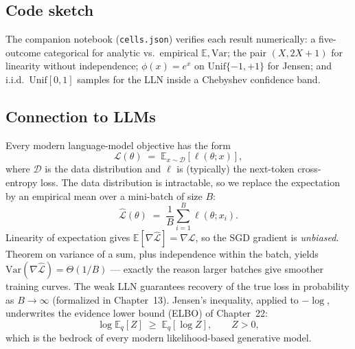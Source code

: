 \subsection*{Code sketch}

The companion notebook (\texttt{cells.json}) verifies each result numerically: a five-outcome categorical for analytic vs.\ empirical $\mathbb{E},\mathrm{Var}$; the pair $(X, 2X+1)$ for linearity without independence; $\phi(x)=e^x$ on $\mathrm{Unif}\{-1,+1\}$ for Jensen; and i.i.d.\ $\mathrm{Unif}[0,1]$ samples for the LLN inside a Chebyshev confidence band.

\subsection*{Connection to LLMs}

Every modern language-model objective has the form
\[
\mathcal{L}(\theta) \;=\; \mathbb{E}_{x\sim\mathcal{D}}[\ell(\theta;x)],
\]
where $\mathcal{D}$ is the data distribution and $\ell$ is (typically) the next-token cross-entropy loss. The data distribution is intractable, so we replace the expectation by an empirical mean over a mini-batch of size $B$:
\[
\hat{\mathcal{L}}(\theta) \;=\; \frac{1}{B}\sum_{i=1}^B \ell(\theta; x_i).
\]
Linearity of expectation gives $\mathbb{E}[\nabla\hat{\mathcal{L}}] = \nabla\mathcal{L}$, so the SGD gradient is \emph{unbiased}. Theorem on variance of a sum, plus independence within the batch, yields $\mathrm{Var}(\nabla\hat{\mathcal{L}}) = \Theta(1/B)$ — exactly the reason larger batches give smoother training curves. The weak LLN guarantees recovery of the true loss in probability as $B\to\infty$ (formalized in Chapter~13). Jensen's inequality, applied to $-\log$, underwrites the evidence lower bound (ELBO) of Chapter~22:
\[
\log \mathbb{E}_{q}[Z] \;\ge\; \mathbb{E}_q[\log Z], \qquad Z > 0,
\]
which is the bedrock of every modern likelihood-based generative model.
